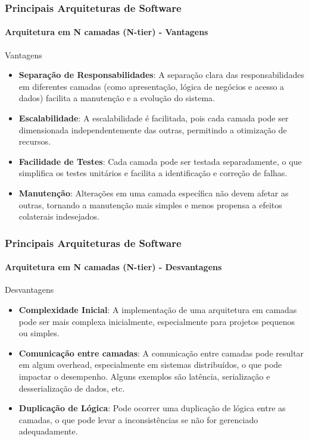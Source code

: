 \documentclass[
	10pt, %
	t, %
]{beamer}
\begin{document}
\begin{frame}
	\frametitle{Principais Arquiteturas de Software}
	\framesubtitle{Arquitetura em N camadas (N-tier) - Vantagens}

	\begin{exampleblock}{Vantagens}
		\begin{itemize}
			\item \textbf{Separação de Responsabilidades}: A separação clara das responsabilidades em diferentes camadas (como apresentação, lógica de negócios e acesso a dados) facilita a manutenção e a evolução do sistema.
			\item \textbf{Escalabilidade}: A escalabilidade é facilitada, pois cada camada pode ser dimensionada independentemente das outras, permitindo a otimização de recursos.
			\item \textbf{Facilidade de Testes}: Cada camada pode ser testada separadamente, o que simplifica os testes unitários e facilita a identificação e correção de falhas.
			\item \textbf{Manutenção}: Alterações em uma camada específica não devem afetar as outras, tornando a manutenção mais simples e menos propensa a efeitos colaterais indesejados.
		\end{itemize}
	\end{exampleblock}

\end{frame}

\begin{frame}
	\frametitle{Principais Arquiteturas de Software}
	\framesubtitle{Arquitetura em N camadas (N-tier) - Desvantagens}

	\begin{alertblock}{Desvantagens}
		\begin{itemize}
			\item \textbf{Complexidade Inicial}: A implementação de uma arquitetura em camadas pode ser mais complexa inicialmente, especialmente para projetos pequenos ou simples.
			\item \textbf{Comunicação entre camadas}: A comunicação entre camadas pode resultar em algum overhead, especialmente em sistemas distribuídos, o que pode impactar o desempenho. Alguns exemplos são latência, serialização e desserialização de dados, etc.
			\item \textbf{Duplicação de Lógica}: Pode ocorrer uma duplicação de lógica entre as camadas, o que pode levar a inconsistências se não for gerenciado adequadamente.
		\end{itemize}
	\end{alertblock}

\end{frame}
\end{document}
